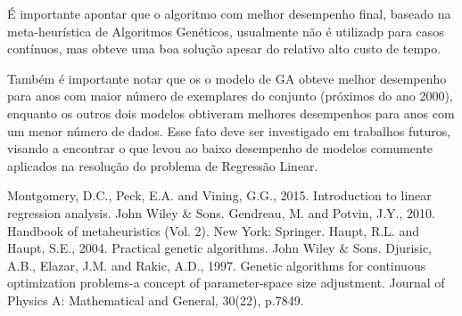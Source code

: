\documentclass[conference]{IEEEtran}
\begin{document}
É importante apontar que o algoritmo com melhor desempenho final, baseado na meta-heurística de Algoritmos Genéticos, usualmente não é utilizadp para casos contínuos, mas obteve uma boa solução apesar do relativo alto custo de tempo. 

Também é importante notar que os o modelo de GA obteve melhor desempenho para anos com maior número de exemplares do conjunto (próximos do ano 2000), enquanto os outros dois modelos obtiveram melhores desempenhos para anos com um menor número de dados. Esse fato deve ser investigado em trabalhos futuros, visando a encontrar o que levou ao baixo desempenho de modelos comumente aplicados na resolução do problema de Regressão Linear.  


\begin{thebibliography}{00}
 Montgomery, D.C., Peck, E.A. and Vining, G.G., 2015. Introduction to linear regression analysis. John Wiley \& Sons.
 Gendreau, M. and Potvin, J.Y., 2010. Handbook of metaheuristics (Vol. 2). New York: Springer.
 Haupt, R.L. and Haupt, S.E., 2004. Practical genetic algorithms. John Wiley \& Sons.
 Djurisic, A.B., Elazar, J.M. and Rakic, A.D., 1997. Genetic algorithms for continuous optimization problems-a concept of parameter-space size adjustment. Journal of Physics A: Mathematical and General, 30(22), p.7849.
\end{thebibliography}
\end{document}
